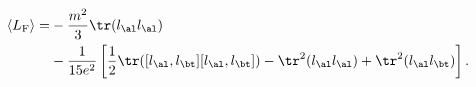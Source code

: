 \begin{equation*}
\begin{split}
  \langle L_\mathrm{F}\rangle=&-\frac{m^2}3\tr(l_\al l_\al)
\\
  &-\frac1{15e^2}\left[\frac12\tr([l_\al,l_\bt][l_\al,l_\bt])
  -\tr^2(l_\al l_\al)+\tr^2(l_\al l_\bt)\right].
\end{split}
\end{equation*}

